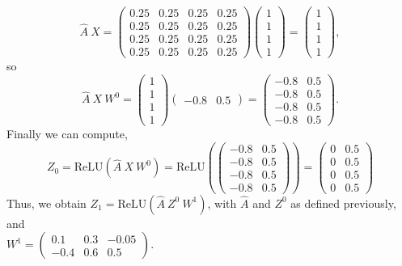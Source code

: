 \documentclass[a4paper]{article}
\begin{document}
\[
\hat{A}\ X = \begin{pmatrix}
0.25 & 0.25 & 0.25 & 0.25 \\
0.25 & 0.25 & 0.25 & 0.25 \\
0.25 & 0.25 & 0.25 & 0.25 \\
0.25 & 0.25 & 0.25 & 0.25
\end{pmatrix} \begin{pmatrix}
    1\\1\\1\\1 \end{pmatrix} = \begin{pmatrix}
    1\\1\\1\\1 \end{pmatrix},
\]
so
\[
\hat{A}\ X\ W^0 = \begin{pmatrix} 1\\1\\1\\1 \end{pmatrix} \begin{pmatrix}
        -0.8 & 0.5
    \end{pmatrix} =  \begin{pmatrix}
        -0.8 & 0.5 \\ -0.8 & 0.5 \\ -0.8 & 0.5 \\ -0.8 & 0.5
    \end{pmatrix} .
\]
Finally we can compute,
\[
Z_0 = \text{ReLU} (\hat{A}\ X\ W^0) = \text{ReLU} (\begin{pmatrix}
        -0.8 & 0.5 \\ -0.8 & 0.5 \\ -0.8 & 0.5 \\ -0.8 & 0.5
    \end{pmatrix} ) = \begin{pmatrix}
        0 & 0.5 \\ 0 & 0.5 \\ 0 & 0.5 \\ 0 & 0.5
    \end{pmatrix} 
\]
Thus, we obtain $Z_1 = \text{ReLU} (\hat{A}\ Z^0\ W^1)$, with $\hat{A}$ and $Z^0$ as defined previously, and\\ $W^1 = \begin{pmatrix}
        0.1 & 0.3 & -0.05 \\ -0.4 & 0.6 & 0.5
    \end{pmatrix}.$
\end{document}
